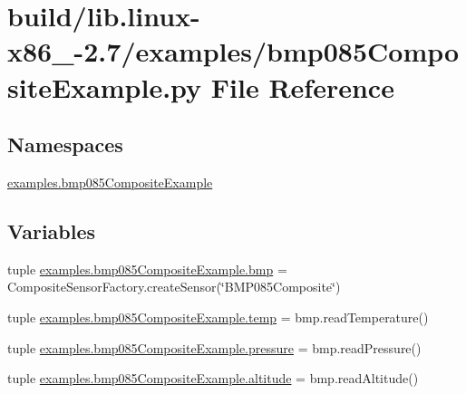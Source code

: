\hypertarget{build_2lib_8linux-x86__64-2_87_2examples_2bmp085CompositeExample_8py}{}\section{build/lib.linux-\/x86\+\_-\/2.7/examples/bmp085\+Composite\+Example.py File Reference}
\label{build_2lib_8linux-x86__64-2_87_2examples_2bmp085CompositeExample_8py}
\subsection*{Namespaces}
\begin{DoxyCompactItemize}
\item 
 \hyperlink{namespaceexamples_1_1bmp085CompositeExample}{examples.\+bmp085\+Composite\+Example}
\end{DoxyCompactItemize}
\subsection*{Variables}
\begin{DoxyCompactItemize}
\item 
tuple \hyperlink{namespaceexamples_1_1bmp085CompositeExample_aa0c7787fb240423d23138aa954c87a0d}{examples.\+bmp085\+Composite\+Example.\+bmp} = Composite\+Sensor\+Factory.\+create\+Sensor(\char`\"{}B\+M\+P085\+Composite\char`\"{})
\item 
tuple \hyperlink{namespaceexamples_1_1bmp085CompositeExample_aeac9716741eb5f58eebaa31e659516ad}{examples.\+bmp085\+Composite\+Example.\+temp} = bmp.\+read\+Temperature()
\item 
tuple \hyperlink{namespaceexamples_1_1bmp085CompositeExample_a229ab88a16a5d1120285622bedfe4b16}{examples.\+bmp085\+Composite\+Example.\+pressure} = bmp.\+read\+Pressure()
\item 
tuple \hyperlink{namespaceexamples_1_1bmp085CompositeExample_a834f047b7853b170a5ad2e7e702b6dae}{examples.\+bmp085\+Composite\+Example.\+altitude} = bmp.\+read\+Altitude()
\end{DoxyCompactItemize}
